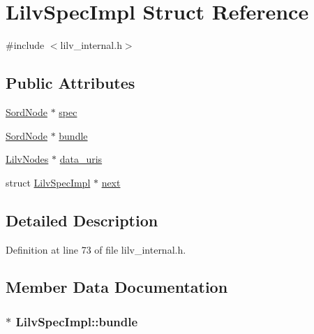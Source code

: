\hypertarget{struct_lilv_spec_impl}{}\section{Lilv\+Spec\+Impl Struct Reference}
\label{struct_lilv_spec_impl}


{\ttfamily \#include $<$lilv\+\_\+internal.\+h$>$}

\subsection*{Public Attributes}
\begin{DoxyCompactItemize}
\item 
\hyperlink{group__sord_ga804ac7d56d9fdea50f2d1e7278b1f82b}{Sord\+Node} $\ast$ \hyperlink{struct_lilv_spec_impl_a659bf23b85a605a3db91623634fe24ae}{spec}
\item 
\hyperlink{group__sord_ga804ac7d56d9fdea50f2d1e7278b1f82b}{Sord\+Node} $\ast$ \hyperlink{struct_lilv_spec_impl_aca47fdbb739dc6657eff1aabd7348aab}{bundle}
\item 
\hyperlink{lilv_8h_a256c2c4443307f320de24bb31198df83}{Lilv\+Nodes} $\ast$ \hyperlink{struct_lilv_spec_impl_a77496c19f1149e32134bf4d0b52cee04}{data\+\_\+uris}
\item 
struct \hyperlink{struct_lilv_spec_impl}{Lilv\+Spec\+Impl} $\ast$ \hyperlink{struct_lilv_spec_impl_a55bd8eb6d22428cd766b40ca088b505d}{next}
\end{DoxyCompactItemize}


\subsection{Detailed Description}


Definition at line 73 of file lilv\+\_\+internal.\+h.



\subsection{Member Data Documentation}
\subsubsection[{\texorpdfstring{bundle}{bundle}}]{$\ast$ Lilv\+Spec\+Impl\+::bundle}\hypertarget{struct_lilv_spec_impl_aca47fdbb739dc6657eff1aabd7348aab}{}\label{struct_lilv_spec_impl_aca47fdbb739dc6657eff1aabd7348aab}


